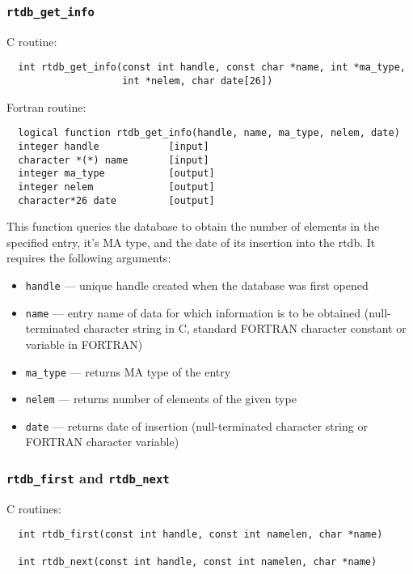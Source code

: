 \subsubsection{{\tt rtdb\_get\_info}}

C routine:

\begin{verbatim}
  int rtdb_get_info(const int handle, const char *name, int *ma_type, 
                    int *nelem, char date[26])
\end{verbatim}


Fortran routine:

\begin{verbatim}
  logical function rtdb_get_info(handle, name, ma_type, nelem, date)
  integer handle            [input]
  character *(*) name       [input]
  integer ma_type           [output]
  integer nelem             [output]
  character*26 date         [output]
\end{verbatim}

This function queries the database to obtain the number of elements in the
specified entry, it's MA type, and the date of its insertion into the rtdb.
It requires the following arguments:

\begin{itemize}
\item {\tt handle} --- unique handle created when the database was first opened
\item {\tt name} --- entry name of data for which information is to be obtained
(null-terminated character string in
  C,  standard FORTRAN character constant or variable in FORTRAN)
\item {\tt ma\_type} --- returns MA type of the entry
\item {\tt nelem} --- returns number of elements of the given type
\item {\tt date} --- returns date of insertion (null-terminated
  character string or FORTRAN character variable)
\end{itemize}

\subsubsection{{\tt rtdb\_first} and {\tt rtdb\_next}}

C routines:

\begin{verbatim}
  int rtdb_first(const int handle, const int namelen, char *name)

  int rtdb_next(const int handle, const int namelen, char *name)
\end{verbatim}


